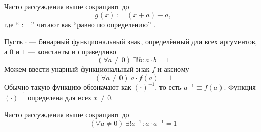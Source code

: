 Часто рассуждения выше сокращают до
\[
  g(x):=(x+a)+a,
\]
где ``$:=$'' читают как ``равно по определению''
.

Пусть $\cdot$ --- бинарный функциональный знак,
определённый для всех аргументов, а
$0$ и $1$ --- константы и справедливо
\[
  (\forall a\neq 0)~\exists !b:a\cdot b=1
\]
Можем ввести унарный функциональный знак $f$ и аксиому
\[
  (\forall a\neq 0)~a\cdot f(a)=1
\]
Обычно такую функцию обозначают как $(\cdot)^{-1}$,
то есть $a^{-1}\equiv f(a)$.
Функция $(\cdot)^{-1}$ определена для всех $x\neq 0$.

Часто рассуждения выше сокращают до
\[
  (\forall a\neq 0)~\exists !a^{-1}:a\cdot a^{-1}=1
\]
